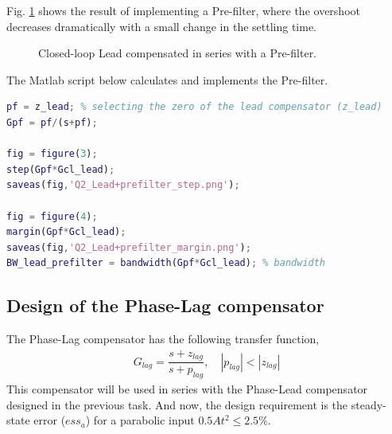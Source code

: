 \documentclass[11pt, a4paper]{article}
\begin{document}
Fig. \ref{fig:Q2_lead+prefilter} shows the result of implementing a Pre-filter, where the overshoot decreases dramatically with a small change in the settling time.
\begin{figure}[H]
	\centering
	\caption{Closed-loop Lead compensated in series with a Pre-filter.}
	\label{fig:Q2_lead+prefilter}
\end{figure}

The Matlab script below calculates and implements the Pre-filter.
\begin{lstlisting}[language=matlab, caption={}, label={}]
%% Using prefilter to reduce the overshoot
pf = z_lead; % selecting the zero of the lead compensator (z_lead)
Gpf = pf/(s+pf);

fig = figure(3);
step(Gpf*Gcl_lead);
saveas(fig,'Q2_Lead+prefilter_step.png');

fig = figure(4);
margin(Gpf*Gcl_lead);
saveas(fig,'Q2_Lead+prefilter_margin.png');
BW_lead_prefilter = bandwidth(Gpf*Gcl_lead); % bandwidth
\end{lstlisting}
  
\subsection{Design of the Phase-Lag compensator}
The Phase-Lag compensator has the following transfer function,
\begin{align}
G_{lag} = \dfrac{s+z_{lag}}{s+p_{lag}}, \quad |p_{lag}|< |z_{lag}|
\end{align}
This compensator will be used in series with the Phase-Lead compensator designed in the previous task. And now, the design requirement is the steady-state error ($ess_a$) for a parabolic input $0.5At^2\leq2.5\%$.
\end{document}
